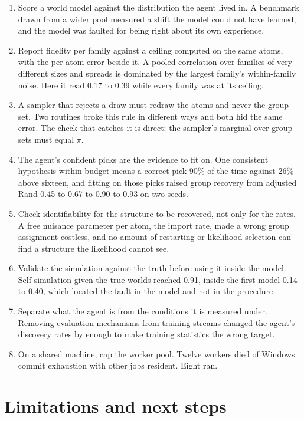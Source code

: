 \documentclass[11pt]{article}
\begin{document}
\begin{enumerate}[leftmargin=*]
\item Score a world model against the distribution the agent lived in. A benchmark drawn from a wider pool measured a shift the model could not have learned, and the model was faulted for being right about its own experience.
\item Report fidelity per family against a ceiling computed on the same atoms, with the per-atom error beside it. A pooled correlation over families of very different sizes and spreads is dominated by the largest family's within-family noise. Here it read 0.17 to 0.39 while every family was at its ceiling.
\item A sampler that rejects a draw must redraw the atoms and never the group set. Two routines broke this rule in different ways and both hid the same error. The check that catches it is direct: the sampler's marginal over group sets must equal $\pi$.
\item The agent's confident picks are the evidence to fit on. One consistent hypothesis within budget means a correct pick 90\% of the time against 26\% above sixteen, and fitting on those picks raised group recovery from adjusted Rand 0.45 to 0.67 to 0.90 to 0.93 on two seeds.
\item Check identifiability for the structure to be recovered, not only for the rates. A free nuisance parameter per atom, the import rate, made a wrong group assignment costless, and no amount of restarting or likelihood selection can find a structure the likelihood cannot see.
\item Validate the simulation against the truth before using it inside the model. Self-simulation given the true worlds reached 0.91, inside the first model 0.14 to 0.40, which located the fault in the model and not in the procedure.
\item Separate what the agent is from the conditions it is measured under. Removing evaluation mechanisms from training streams changed the agent's discovery rates by enough to make training statistics the wrong target.
\item On a shared machine, cap the worker pool. Twelve workers died of Windows commit exhaustion with other jobs resident. Eight ran.
\end{enumerate}

\section{Limitations and next steps}
\end{document}
